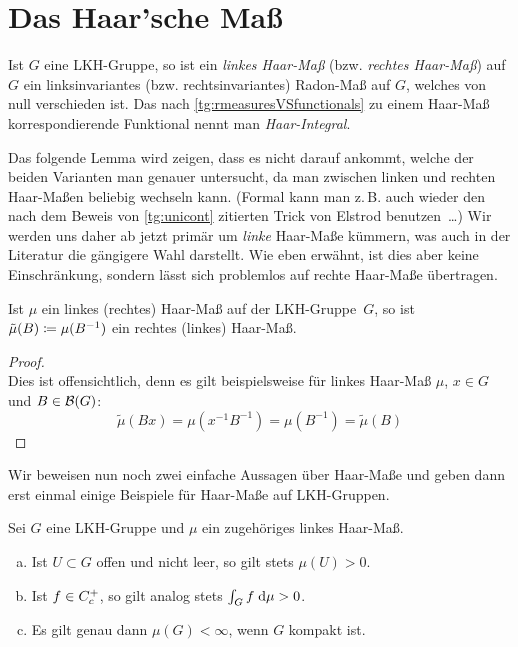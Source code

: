 \section{Das Haar'sche Maß}
\begin{thDef}
    Ist $G$ eine LKH-Gruppe, so ist ein \emph{linkes Haar-Maß} (bzw.
    \emph{rechtes Haar-Maß}) auf $G$ ein linksinvariantes (bzw.
    rechtsinvariantes) Radon-Maß auf $G$, welches von null verschieden ist.
    Das nach \cref{tg:rmeasuresVSfunctionals} zu einem Haar-Maß
    korrespondierende Funktional nennt man \emph{Haar-Integral}.
\end{thDef}

Das folgende Lemma wird zeigen, dass es nicht darauf ankommt, welche der beiden
Varianten man genauer untersucht, da man zwischen linken und rechten Haar-Maßen
beliebig wechseln kann. (Formal kann man z.\,B. auch wieder den nach dem Beweis
von \cref{tg:unicont} zitierten Trick von Elstrod benutzen~\ldots)
Wir werden uns daher ab jetzt primär um \emph{linke} Haar-Maße kümmern, was
auch in der Literatur die gängigere Wahl darstellt. Wie eben erwähnt, ist dies
aber keine Einschränkung, sondern lässt sich problemlos auf rechte Haar-Maße
übertragen.
%
\begin{thLemma}
    \label{tg:leftrighthaar}
    Ist $\mu$ ein linkes (rechtes) Haar-Maß auf der LKH-Gruppe~$G$, 
    so ist $\tilde\mu(B) \coloneqq \mu(B^{-1})$ ein rechtes (linkes) Haar-Maß.
\end{thLemma}

\begin{proof}\hfill\\
    Dies ist offensichtlich, denn es gilt beispielsweise für linkes Haar-Maß
    $\mu$, $x\in G$ und $B\in\mathcal{B}(G)$:
    \[ \tilde\mu(Bx) = \mu(x^{-1}B^{-1}) = \mu(B^{-1}) = \tilde\mu(B) \]
\end{proof}

Wir beweisen nun noch zwei einfache Aussagen über Haar-Maße und geben dann erst
einmal einige Beispiele für Haar-Maße auf LKH-Gruppen.

\begin{thLemma}
    \label{tg:haarbasics}
    Sei $G$ eine LKH-Gruppe und $\mu$ ein zugehöriges linkes Haar-Maß.
    \begin{enumerate}[a)]
        \item\label{tg:haarbasics:openset}
            Ist $U\subset G$ offen und nicht leer, so gilt stets $\mu(U)>0$.
        \item\label{tg:haarbasics:int}
            Ist $f\in C_c^+$, so gilt analog stets $\int_G f\;\mathrm{d} \mu>0$.
        \item\label{tg:haarbasics:compactness}
            Es gilt genau dann $\mu(G)<\infty$, wenn $G$ kompakt ist.
    \end{enumerate}
\end{thLemma}

